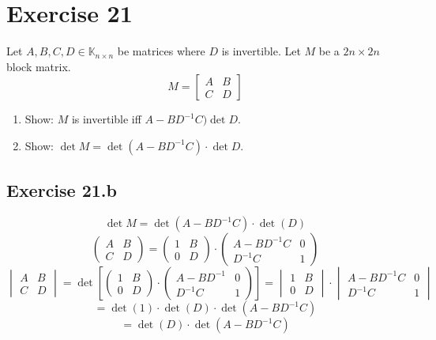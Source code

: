 \documentclass[a4paper]{article}
\theoremstyle{definition}
\begin{document}
\section{Exercise 21}
\begin{ex}
  Let $A, B, C, D \in \mathbb K_{n\times n}$ be matrices where $D$ is invertible.
  Let $M$ be a $2n \times 2n$ block matrix.
  \[
    M = \begin{bmatrix}
      A & B \\
      C & D
    \end{bmatrix}
  \]
  \begin{enumerate}
    \item Show: $M$ is invertible iff $A - BD^{-1}C) \det{D}$.
    \item Show: $\det{M} = \det(A - BD^{-1} C) \cdot \det{D}$.
  \end{enumerate}
\end{ex}

\subsection{Exercise 21.b}

\[
  \det{M} = \det(A - B D^{-1} C) \cdot \det(D)
\] \[
  \begin{pmatrix}
    A & B \\
    C & D
  \end{pmatrix} = \begin{pmatrix}
    1 & B \\
    0 & D
  \end{pmatrix} \cdot \begin{pmatrix}
    A - BD^{-1} C & 0 \\
    D^{-1} C & 1
  \end{pmatrix}
\] \[
  \begin{vmatrix}
    A & B \\
    C & D
  \end{vmatrix}
  = \operatorname{det}\left[
    \begin{pmatrix}
      1 & B \\
      0 & D
    \end{pmatrix} \cdot \begin{pmatrix}
      A - BD^{-1} & 0 \\
      D^{-1} C & 1
    \end{pmatrix}
  \right]
  = \begin{vmatrix}
  1 & B \\
  0 & D
  \end{vmatrix} \cdot \begin{vmatrix}
  A - B D^{-1} C & 0 \\
  D^{-1} C & 1
  \end{vmatrix}
\] \[
  = \det(1) \cdot \det(D) \cdot \det(A - BD^{-1} C)
\] \[
  = \det(D) \cdot \det(A - BD^{-1} C)
\]
\end{document}
